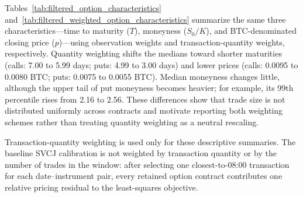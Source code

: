 Tables~\ref{tab:filtered_option_characteristics} and~\ref{tab:filtered_weighted_option_characteristics} summarize the same three characteristics---time to maturity ($T$), moneyness ($S_0/K$), and BTC-denominated closing price ($p$)---using observation weights and transaction-quantity weights, respectively. Quantity weighting shifts the medians toward shorter maturities (calls: 7.00 to 5.99 days; puts: 4.99 to 3.00 days) and lower prices (calls: 0.0095 to 0.0080 BTC; puts: 0.0075 to 0.0055 BTC). Median moneyness changes little, although the upper tail of put moneyness becomes heavier; for example, its 99th percentile rises from 2.16 to 2.56. These differences show that trade size is not distributed uniformly across contracts and motivate reporting both weighting schemes rather than treating quantity weighting as a neutral rescaling.

Transaction-quantity weighting is used only for these descriptive summaries. The baseline SVCJ calibration is not weighted by transaction quantity or by the number of trades in the window: after selecting one closest-to-08:00 transaction for each date--instrument pair, every retained option contract contributes one relative pricing residual to the least-squares objective.



